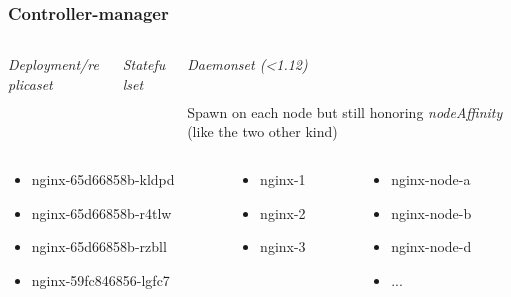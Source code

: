 \documentclass{beamer}
\begin{document}
\begin{frame}
\begin{center}
  \end{center}
\end{frame}

\begin{frame}
  \frametitle{Controller-manager}
  \begin{columns}
  \begin{column}{0.3\textwidth}
    \textit{Deployment/replicaset}
    \inputminted[fontsize=\tiny,frame=single]{yaml}{resources/deployment.yaml}
  \end{column}
  \begin{column}{0.39\textwidth}
    \textit{Statefulset}
    \inputminted[fontsize=\tiny,frame=single]{yaml}{resources/statefulset.yaml}
  \end{column}
  \begin{column}{0.3\textwidth}
    \textit{Daemonset (<1.12)}
    \inputminted[fontsize=\tiny,frame=single]{yaml}{resources/daemonset.yaml}
    \scriptsize{
      Spawn on each node but still honoring \textit{nodeAffinity} (like the two other kind)
    }
  \end{column}
  \end{columns}
  \begin{columns}
  \begin{column}{0.4\textwidth}
    \scriptsize{
      \begin{itemize}
        \item nginx-65d66858b-kldpd
        \item nginx-65d66858b-r4tlw
        \item nginx-65d66858b-rzbll
        \item nginx-59fc846856-lgfc7
      \end{itemize}
    }
  \end{column}
  \begin{column}{0.3\textwidth}
    \scriptsize{
      \begin{itemize}
        \item nginx-1
        \item nginx-2
        \item nginx-3
      \end{itemize}
    }
  \end{column}
  \begin{column}{0.3\textwidth}
    \scriptsize{
      \begin{itemize}
        \item nginx-node-a
        \item nginx-node-b
        \item nginx-node-d
        \item ...
      \end{itemize}
    }
  \end{column}
  \end{columns}

\end{frame}
\end{document}
